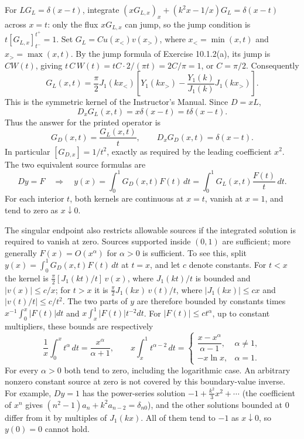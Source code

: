 For $LG_L=\delta(x-t)$, integrate
$(xG_{L,x})_x+(k^2x-1/x)G_L=\delta(x-t)$ across $x=t$: only the
flux $xG_{L,x}$ can jump, so the jump condition is
$t[G_{L,x}]_{t^-}^{t^+}=1$. Set
$G_L=C u(x_<)v(x_>)$, where $x_<=\min(x,t)$ and
$x_>=\max(x,t)$. By the jump formula of Exercise 10.1.2(a), its
jump is $CW(t)$, giving
$t\,C\,W(t)=tC\cdot2/(\pi t)=2C/\pi=1$, or $C=\pi/2$. Consequently
\[
\boxed{G_L(x,t)=\frac\pi2J_1(kx_<)
\left[Y_1(kx_>)-\frac{Y_1(k)}{J_1(k)}J_1(kx_>)\right].}
\]
This is the symmetric kernel of the Instructor's Manual. Since $D=xL$,
\[
D_xG_L(x,t)=x\delta(x-t)=t\delta(x-t).
\]
Thus the answer for the printed operator is
\[
\boxed{G_D(x,t)=\frac{G_L(x,t)}t,\qquad D_xG_D(x,t)=\delta(x-t).}
\]
In particular $[G_{D,x}]=1/t^2$, exactly as required by the leading
coefficient $x^2$. The two equivalent source formulas are
\[
Dy=F\quad\Longrightarrow\quad
y(x)=\int_0^1G_D(x,t)F(t)\,dt
     =\int_0^1G_L(x,t)\frac{F(t)}t\,dt.
\]
For each interior $t$, both kernels are continuous at $x=t$, vanish at
$x=1$, and tend to zero as $x\downarrow0$.

The singular endpoint also restricts allowable sources if the integrated
solution is required to vanish at zero. Sources supported inside $(0,1)$
are sufficient; more generally $F(x)=O(x^\alpha)$ for $\alpha>0$ is
sufficient. To see this, split $y(x)=\int_0^1G_D(x,t)F(t)\,dt$ at
$t=x$, and let $c$ denote constants. For $t<x$ the kernel is
$\frac\pi2[J_1(kt)/t]\,v(x)$, where $J_1(kt)/t$ is bounded and
$|v(x)|\le c/x$; for $t>x$ it is $\frac\pi2J_1(kx)\,v(t)/t$, where
$|J_1(kx)|\le cx$ and $|v(t)/t|\le c/t^2$. The two parts of $y$ are
therefore bounded by constants times $x^{-1}\int_0^x|F(t)|dt$ and
$x\int_x^1|F(t)|t^{-2}dt$. For $|F(t)|\le ct^\alpha$, up to constant
multipliers, these bounds are respectively
\[
\frac1x\int_0^x t^\alpha\,dt=\frac{x^\alpha}{\alpha+1},
\qquad
x\int_x^1t^{\alpha-2}\,dt=
\begin{cases}
\dfrac{x-x^\alpha}{\alpha-1},&\alpha\ne1,\\
-x\ln x,&\alpha=1.
\end{cases}
\]
For every $\alpha>0$ both tend to zero, including the logarithmic case.
An arbitrary nonzero constant source at zero is not covered by this
boundary-value inverse. For example, $Dy=1$ has the power-series
solution $-1+\frac{k^2}3x^2+\cdots$ (the coefficient of $x^n$ gives
$(n^2-1)a_n+k^2a_{n-2}=\delta_{n0}$), and the other solutions bounded
at $0$ differ from it by multiples of $J_1(kx)$. All of them tend to
$-1$ as $x\downarrow0$, so $y(0)=0$ cannot hold.


